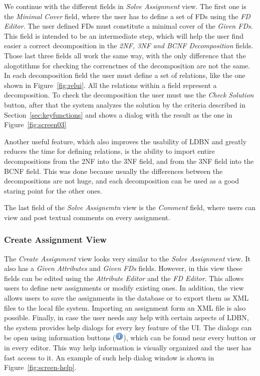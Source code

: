 We continue with the different fields in \textit{Solve Assignment} view. 
The first one is the \textit{Minimal Cover} field, where the user has to define 
a set of FDs using the \textit{FD Editor}. The user defined FDs must
constitute a minimal cover of the \textit{Given FDs}.
This field is intended to be an intermediate step, which will help the user 
find easier a correct decomposition
in the \textit{2NF, 3NF and BCNF Decomposition} fields. Those last three fields all
work the same way, with the only difference that the alogotithms for checking the 
correnctnes of the 
decomposition are not the same.  
In each decomposition field the user must define a set of relations, like the one shown 
in Figure~\ref{fig:relui}. All the relations
within a field represent a decomposition. To check the decomposition the user must
use the \textit{Check Solution} button, 
after that the system analyzes the solution by the criteria described in 
Section~\ref{sec:keyfunctions} and shows a dialog with the result 
as the one in Figure~\ref{fig:screen03} 

Another useful feature, which also improves the usability of LDBN and greatly reduces
the time for defining relations, 
is the ability to 
import entire decompositions from the 2NF into the 3NF field, and from the 
3NF field into the BCNF field. This was done because usually 
the differences between the decompositions are not huge, and each decomposition
can be used as a good staring point for the other ones.	

The last field of the \textit{Solve Assignemtn} view is the \textit{Comment} field, 
where users can view and post textual comments on every assignment.

\subsubsection{Create Assignment View}
The \textit{Create Assignment} view looks very similar to the 
\textit{Solve Assignment} view. It also has a \textit{Given Attributes} and 
\textit{Given FDs} fields. However, in this view these fields
can be edited using the \textit{Attribute Editor} and the \textit{FD Editor}. 
This allows users to define new assignments or modify existing ones. In addition, the view
allows users to save the assignments in the database or to export them as XML
files to the local file system. Importing an assignment form an XML file is also 
possible.  
\newline
Finally, in case the user needs any help with certain aspects of LDBN, the system provides 
help dialogs for every key feature of the UI. The dialogs can be open
using information buttons (\includegraphics[scale=0.5]{./img/info.png}), which can be
found near every button or in every editor. This way help information is 
visually organized and the user has fast access to it. An example of such help dialog
window is shown in Figure~\ref{fig:screen-help}.

